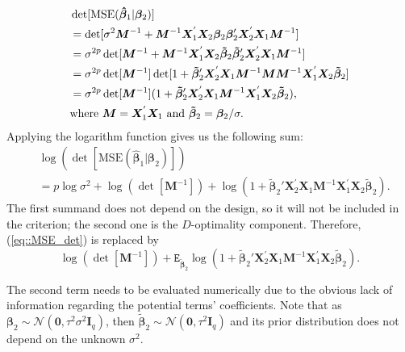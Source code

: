 \begin{align}
\label{eq::mse_det_dec}
&\det[\mbox{MSE}(\bm{\hat{\beta}}_1|\bm{\beta}_2)]\notag\\&=\det[\sigma^2\bm{M}^{-1}+\bm{M}^{-1}\bm{X}_1^{'}\bm{X}_2\bm{\beta}_2\bm{\beta}_2'\bm{X}_2^{'}\bm{X}_1\bm{M}^{-1}]\notag\\&=\sigma^{2p}\det[\bm{M}^{-1}+\bm{M}^{-1}\bm{X}_1^{'}\bm{X}_2\bm{\tilde{\beta}}_2\bm{\tilde{\beta}}_2'\bm{X}_2^{'}\bm{X}_1\bm{M}^{-1}]\notag\\&=\sigma^{2p}\det[\bm{M}^{-1}]\det[1+\bm{\tilde{\beta}}_2'\bm{X}_2^{'}\bm{X}_1\bm{M}^{-1}\bm{M}\bm{M}^{-1}\bm{X}_1^{'}\bm{X}_2\bm{\tilde{\beta}}_2]\notag\\&=\sigma^{2p}\det[\bm{M}^{-1}](1+\bm{\tilde{\beta}}_2'\bm{X}_2^{'}\bm{X}_1\bm{M}^{-1}\bm{X}_1^{'}\bm{X}_2\bm{\tilde{\beta}}_2),\\
&\mbox{where } \bm{M}=\bm{X}_1^{'}\bm{X}_1 \mbox{ and }\bm{\tilde{\beta}}_2=\bm{\beta}_2/\sigma. \notag
\end{align}
Applying the logarithm function gives us the following sum:
\begin{align*}
&\log(\det[\mbox{MSE}(\bm{\hat{\beta}}_1|\bm{\beta}_2)])\\&=p\log\sigma^2+\log(\det[\bm{M}^{-1}])+\log(1+\bm{\tilde{\beta}}_2'\bm{X}_2^{'}\bm{X}_1\bm{M}^{-1}\bm{X}_1^{'}\bm{X}_2\bm{\tilde{\beta}}_2). 
\end{align*}
The first summand does not depend on the design, so it will not be included in the criterion; the second one is the $D$-optimality component. Therefore, (\ref{eq::MSE_det}) is replaced by
\begin{equation*}
\log(\det[\bm{M}^{-1}])+\mathtt{E}_{\bm{\tilde{\beta}}_2}\log(1+\bm{\tilde{\beta}}_2'\bm{X}_2^{'}\bm{X}_1\bm{M}^{-1}\bm{X}_1^{'}\bm{X}_2\bm{\tilde{\beta}}_2).
\end{equation*}

The second term needs to be evaluated numerically due to the obvious lack of information regarding the potential terms' coefficients. Note that as $\bm{\beta}_2 \sim \mathcal{N}(\bm{0},\tau^{2}\sigma^{2}\bm{I}_{q})$, then $\bm{\tilde{\beta}}_2 \sim \mathcal{N}(\bm{0},\tau^{2}\bm{I}_{q})$ and its prior distribution does not depend on the unknown $\sigma^2$.

